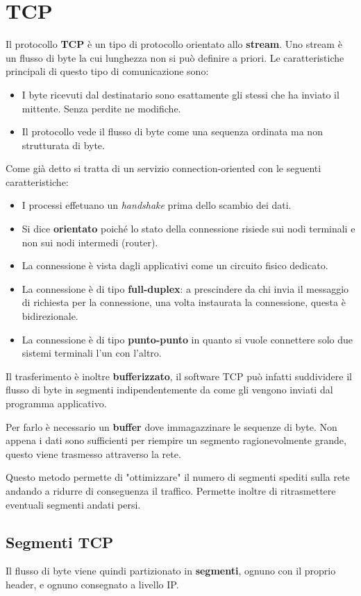 \section{TCP}
Il protocollo \textbf{TCP} è un tipo di protocollo orientato allo \textbf{stream}. Uno stream è
un flusso di byte la cui lunghezza non si può definire a priori. Le caratteristiche principali di
questo tipo di comunicazione sono:
\begin{itemize}
	\item I byte ricevuti dal destinatario sono esattamente gli stessi che ha inviato il mittente.
	      Senza perdite ne modifiche.
	\item Il protocollo vede il flusso di byte come una sequenza ordinata ma non strutturata di
	      byte.
\end{itemize}
Come già detto si tratta di un servizio connection-oriented con le seguenti caratteristiche:
\begin{itemize}
	\item I processi effetuano un \emph{handshake} prima dello scambio dei dati.
	\item Si dice \textbf{orientato} poiché lo stato della connessione risiede sui nodi terminali
	      e non sui nodi intermedi (router).
	\item La connessione è vista dagli applicativi come un circuito fisico dedicato.
	\item La connessione è di tipo \textbf{full-duplex}: a prescindere da chi invia il messaggio
	      di richiesta per la connessione, una volta instaurata la connessione, questa è
	      bidirezionale.
	\item La connessione è di tipo \textbf{punto-punto} in quanto si vuole connettere solo due
	      sistemi terminali l'un con l'altro.
\end{itemize}
Il trasferimento è inoltre \textbf{bufferizzato}, il software TCP può infatti suddividere il flusso
di byte in segmenti indipendentemente da come gli vengono inviati dal programma applicativo.

Per farlo è necessario un \textbf{buffer} dove immagazzinare le sequenze di byte. Non appena i dati
sono sufficienti per riempire un segmento ragionevolmente grande, questo viene trasmesso attraverso
la rete.

Questo metodo permette di "ottimizzare" il numero di segmenti spediti sulla rete andando a ridurre
di conseguenza il traffico. Permette inoltre di ritrasmettere eventuali segmenti andati persi.

\subsection{Segmenti TCP}
Il flusso di byte viene quindi partizionato in \textbf{segmenti}, ognuno con il proprio header, e
ognuno consegnato a livello IP.

